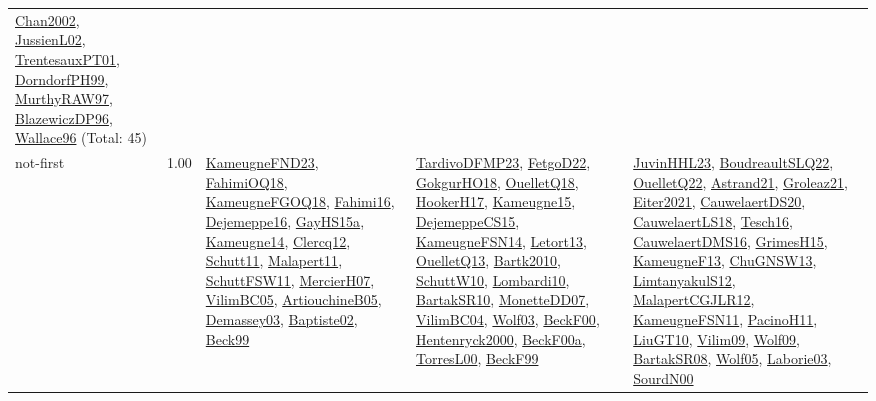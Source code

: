 {\begin{longtable}{p{3cm}r>{\raggedright\arraybackslash}p{6cm}>{\raggedright\arraybackslash}p{6cm}>{\raggedright\arraybackslash}p{8cm}}
\hyperref[detail:Chan2002]{Chan2002}, \hyperref[detail:JussienL02]{JussienL02}, \hyperref[detail:TrentesauxPT01]{TrentesauxPT01}, \hyperref[detail:DorndorfPH99]{DorndorfPH99}, \hyperref[detail:MurthyRAW97]{MurthyRAW97}, \hyperref[detail:BlazewiczDP96]{BlazewiczDP96}, \hyperref[detail:Wallace96]{Wallace96} (Total: 45)\\
\index{not-first}\index{Algorithms!not-first}not-first &  1.00 & \hyperref[detail:KameugneFND23]{KameugneFND23}, \hyperref[detail:FahimiOQ18]{FahimiOQ18}, \hyperref[detail:KameugneFGOQ18]{KameugneFGOQ18}, \hyperref[detail:Fahimi16]{Fahimi16}, \hyperref[detail:Dejemeppe16]{Dejemeppe16}, \hyperref[detail:GayHS15a]{GayHS15a}, \hyperref[detail:Kameugne14]{Kameugne14}, \hyperref[detail:Clercq12]{Clercq12}, \hyperref[detail:Schutt11]{Schutt11}, \hyperref[detail:Malapert11]{Malapert11}, \hyperref[detail:SchuttFSW11]{SchuttFSW11}, \hyperref[detail:MercierH07]{MercierH07}, \hyperref[detail:VilimBC05]{VilimBC05}, \hyperref[detail:ArtiouchineB05]{ArtiouchineB05}, \hyperref[detail:Demassey03]{Demassey03}, \hyperref[detail:Baptiste02]{Baptiste02}, \hyperref[detail:Beck99]{Beck99} & \hyperref[detail:TardivoDFMP23]{TardivoDFMP23}, \hyperref[detail:FetgoD22]{FetgoD22}, \hyperref[detail:GokgurHO18]{GokgurHO18}, \hyperref[detail:OuelletQ18]{OuelletQ18}, \hyperref[detail:HookerH17]{HookerH17}, \hyperref[detail:Kameugne15]{Kameugne15}, \hyperref[detail:DejemeppeCS15]{DejemeppeCS15}, \hyperref[detail:KameugneFSN14]{KameugneFSN14}, \hyperref[detail:Letort13]{Letort13}, \hyperref[detail:OuelletQ13]{OuelletQ13}, \hyperref[detail:Bartk2010]{Bartk2010}, \hyperref[detail:SchuttW10]{SchuttW10}, \hyperref[detail:Lombardi10]{Lombardi10}, \hyperref[detail:BartakSR10]{BartakSR10}, \hyperref[detail:MonetteDD07]{MonetteDD07}, \hyperref[detail:VilimBC04]{VilimBC04}, \hyperref[detail:Wolf03]{Wolf03}, \hyperref[detail:BeckF00]{BeckF00}, \hyperref[detail:Hentenryck2000]{Hentenryck2000}, \hyperref[detail:BeckF00a]{BeckF00a}, \hyperref[detail:TorresL00]{TorresL00}, \hyperref[detail:BeckF99]{BeckF99} & \hyperref[detail:JuvinHHL23]{JuvinHHL23}, \hyperref[detail:BoudreaultSLQ22]{BoudreaultSLQ22}, \hyperref[detail:OuelletQ22]{OuelletQ22}, \hyperref[detail:Astrand21]{Astrand21}, \hyperref[detail:Groleaz21]{Groleaz21}, \hyperref[detail:Eiter2021]{Eiter2021}, \hyperref[detail:CauwelaertDS20]{CauwelaertDS20}, \hyperref[detail:CauwelaertLS18]{CauwelaertLS18}, \hyperref[detail:Tesch16]{Tesch16}, \hyperref[detail:CauwelaertDMS16]{CauwelaertDMS16}, \hyperref[detail:GrimesH15]{GrimesH15}, \hyperref[detail:KameugneF13]{KameugneF13}, \hyperref[detail:ChuGNSW13]{ChuGNSW13}, \hyperref[detail:LimtanyakulS12]{LimtanyakulS12}, \hyperref[detail:MalapertCGJLR12]{MalapertCGJLR12}, \hyperref[detail:KameugneFSN11]{KameugneFSN11}, \hyperref[detail:PacinoH11]{PacinoH11}, \hyperref[detail:LiuGT10]{LiuGT10}, \hyperref[detail:Vilim09]{Vilim09}, \hyperref[detail:Wolf09]{Wolf09}, \hyperref[detail:BartakSR08]{BartakSR08}, \hyperref[detail:Wolf05]{Wolf05}, \hyperref[detail:Laborie03]{Laborie03}, \hyperref[detail:SourdN00]{SourdN00}\\

\end{longtable}}
